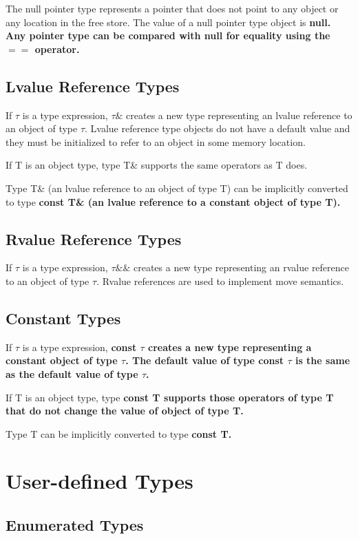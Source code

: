 \documentclass[a4paper,oneside,11pt]{article}
\begin{document}
The null pointer type represents a pointer that does not point to any object or any location in the free store.
The value of a null pointer type object is \bf{null}.
Any pointer type can be compared with \bf{null} for equality using the $==$ operator.

\subsection{Lvalue Reference Types}

If $\tau$ is a type expression, $\tau\&$ creates a new type representing an lvalue reference to an object of type $\tau$.
Lvalue reference type objects do not have a default value and they must be initialized to refer to an object in some memory location.

If T is an object type, type T\& supports the same operators as T does.

Type T\& (an lvalue reference to an object of type T) can be implicitly converted to type \bf{const} T\&
(an lvalue reference to a constant object of type T).

\subsection{Rvalue Reference Types}

If $\tau$ is a type expression, $\tau\&\&$ creates a new type representing an rvalue reference to an object of type $\tau$.
Rvalue references are used to implement move semantics.

\subsection{Constant Types}

If $\tau$ is a type expression, \bf{const} $\tau$ creates a new type representing a constant object of type $\tau$.
The default value of type \bf{const} $\tau$ is the same as the default value of type $\tau$.

If T is an object type, type \bf{const} T supports those operators of type T that do not change the value of object of type T.

Type T can be implicitly converted to type \bf{const} T.

\section{User-defined Types}

\subsection{Enumerated Types}\label{sec:enumerations}
\end{document}
